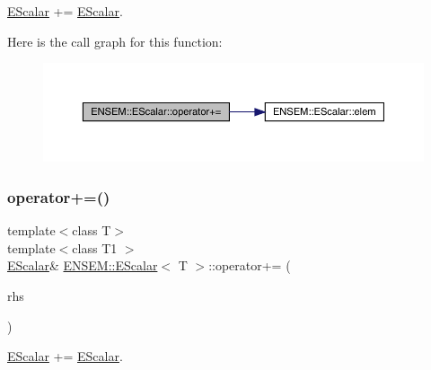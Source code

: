 \mbox{\hyperlink{classENSEM_1_1EScalar}{E\+Scalar}} += \mbox{\hyperlink{classENSEM_1_1EScalar}{E\+Scalar}}. 

Here is the call graph for this function\+:
\nopagebreak
\begin{figure}[H]
\begin{center}
\leavevmode
\includegraphics[width=350pt]{d0/d82/classENSEM_1_1EScalar_aa34f8bd686adb144a6d0e5e8f69787ce_cgraph}
\end{center}
\end{figure}
\mbox{\label{classENSEM_1_1EScalar_aa34f8bd686adb144a6d0e5e8f69787ce}} 
\subsubsection{\texorpdfstring{operator+=()}{operator+=()}\hspace{0.1cm}{\footnotesize\ttfamily [2/3]}}
{\footnotesize\ttfamily template$<$class T$>$ \\
template$<$class T1 $>$ \\
\mbox{\hyperlink{classENSEM_1_1EScalar}{E\+Scalar}}\& \mbox{\hyperlink{classENSEM_1_1EScalar}{E\+N\+S\+E\+M\+::\+E\+Scalar}}$<$ T $>$\+::operator+= (\begin{DoxyParamCaption}\item[{const \mbox{\hyperlink{classENSEM_1_1EScalar}{E\+Scalar}}$<$ T1 $>$ \&}]{rhs }\end{DoxyParamCaption})\hspace{0.3cm}{\ttfamily [inline]}}



\mbox{\hyperlink{classENSEM_1_1EScalar}{E\+Scalar}} += \mbox{\hyperlink{classENSEM_1_1EScalar}{E\+Scalar}}. 

